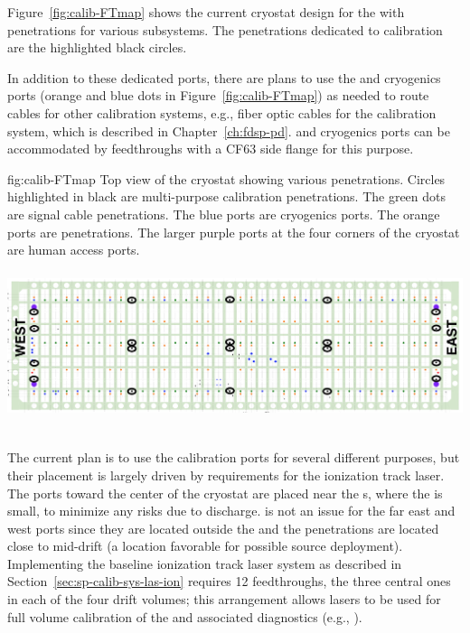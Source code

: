 
Figure~\ref{fig:calib-FTmap} shows the current cryostat design for the %
 with penetrations for various subsystems. The penetrations dedicated to calibration are the highlighted black circles. 

In addition to these dedicated ports, there are plans to use the  and cryogenics ports (orange and blue dots in Figure~\ref{fig:calib-FTmap}) as needed to route cables for other calibration systems, e.g., fiber optic cables for the  calibration system, which is described in Chapter~\ref{ch:fdsp-pd}.  and cryogenics ports can be accommodated by feedthroughs with a CF63 side flange for this purpose.   

\begin{dunefigure}{fig:calib-FTmap}
{Top view of the \spmod %
cryostat showing various penetrations. Circles highlighted in black are multi-purpose calibration penetrations. The green dots are  signal cable penetrations. The blue ports are cryogenics ports. The orange ports are  penetrations. The larger purple ports at the four corners of the cryostat are human access ports.}
\includegraphics[height=2.0in]{graphics/calib-FTmap.png}
\end{dunefigure}

The current plan is to use the calibration ports for several different purposes, but their placement is largely driven by requirements for the ionization track laser. %
The ports %
toward the center of the cryostat are placed near the s, where the \efield is small, %
to minimize any risks due to %
 discharge.  is not an issue for the far east and west ports since they are located outside the  and the penetrations are located %
close to mid-drift (a location favorable for possible source deployment).
Implementing the baseline ionization track laser system as %
described in Section~\ref{sec:sp-calib-sys-las-ion} requires \num{12} feedthroughs, the three central ones in each of the four  drift volumes; this arrangement allows lasers to be used for full volume calibration of the \efield and associated diagnostics (e.g., ). 

